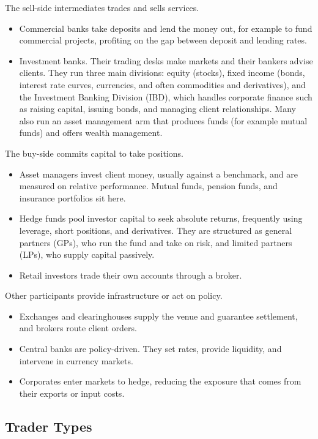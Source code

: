 The sell-side intermediates trades and sells services.
\begin{itemize}[label=--]
    \item Commercial banks take deposits and lend the money out, for example to fund commercial projects, profiting on the gap between deposit and lending rates.
    \item Investment banks. Their trading desks make markets and their bankers advise clients. They run three main divisions: equity (stocks), fixed income (bonds, interest rate curves, currencies, and often commodities and derivatives), and the Investment Banking Division (IBD), which handles corporate finance such as raising capital, issuing bonds, and managing client relationships. Many also run an asset management arm that produces funds (for example mutual funds) and offers wealth management.
\end{itemize}

The buy-side commits capital to take positions.
\begin{itemize}[label=--]
    \item Asset managers invest client money, usually against a benchmark, and are measured on relative performance. Mutual funds, pension funds, and insurance portfolios sit here.
    \item Hedge funds pool investor capital to seek absolute returns, frequently using leverage, short positions, and derivatives. They are structured as general partners (GPs), who run the fund and take on risk, and limited partners (LPs), who supply capital passively.
    \item Retail investors trade their own accounts through a broker.
\end{itemize}

Other participants provide infrastructure or act on policy.
\begin{itemize}[label=--]
    \item Exchanges and clearinghouses supply the venue and guarantee settlement, and brokers route client orders.
    \item Central banks are policy-driven. They set rates, provide liquidity, and intervene in currency markets.
    \item Corporates enter markets to hedge, reducing the exposure that comes from their exports or input costs.
\end{itemize}

\bigskip

\subsection{Trader Types}

